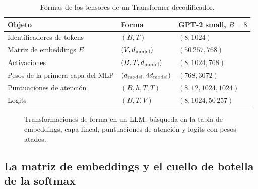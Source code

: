 \begin{table}[h]
\centering\small
\caption{Formas de los tensores de un Transformer decodificador.}\label{tab:formas}
\begin{tabular}{@{}lll@{}}
\toprule
Objeto & Forma & GPT-2 small, $B=8$ \\
\midrule
Identificadores de tokens & $(B,T)$ & $(8,1024)$ \\
Matriz de embeddings $E$ & $(V,d_{\mathrm{model}})$ & $(50\,257,768)$ \\
Activaciones & $(B,T,d_{\mathrm{model}})$ & $(8,1024,768)$ \\
Pesos de la primera capa del MLP & $(d_{\mathrm{model}},4d_{\mathrm{model}})$ & $(768,3072)$ \\
Puntuaciones de atención & $(B,h,T,T)$ & $(8,12,1024,1024)$ \\
Logits & $(B,T,V)$ & $(8,1024,50\,257)$ \\
\bottomrule
\end{tabular}
\end{table}

\begin{figure}[h]
\centering
{}
\caption{Transformaciones de forma en un LLM: búsqueda en la tabla de embeddings, capa lineal, puntuaciones de atención y logits con pesos atados.}
\label{fig:formas}
\end{figure}

\subsection*{La matriz de embeddings y el cuello de botella de la softmax}

